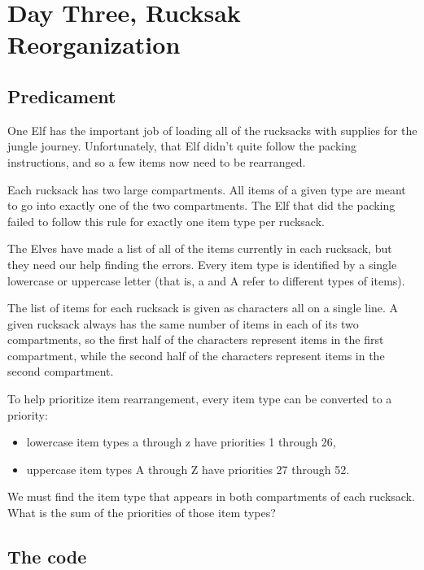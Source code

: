 \documentclass[]{article}
\begin{document}
    
  \section{Day Three, Rucksak Reorganization}

    \subsection{Predicament}

    One Elf has the important job of loading all of the rucksacks with supplies for the jungle journey. Unfortunately, that Elf didn't quite follow the packing instructions, and so a few items now need to be rearranged.

    Each rucksack has two large compartments. All items of a given type are meant to go into exactly one of the two compartments. The Elf that did the packing failed to follow this rule for exactly one item type per rucksack.
    
    The Elves have made a list of all of the items currently in each rucksack, but they need our help finding the errors. Every item type is identified by a single lowercase or uppercase letter (that is, a and A refer to different types of items).

    The list of items for each rucksack is given as characters all on a single line. A given rucksack always has the same number of items in each of its two compartments, so the first half of the characters represent items in the first compartment, while the second half of the characters represent items in the second compartment.
    
    To help prioritize item rearrangement, every item type can be converted to a priority:

    \begin{itemize}
      \item lowercase item types a through z have priorities 1 through 26,
      \item uppercase item types A through Z have priorities 27 through 52.
    \end{itemize}

    We must find the item type that appears in both compartments of each rucksack. What is the sum of the priorities of those item types?

    \subsection{The code}
\end{document}
